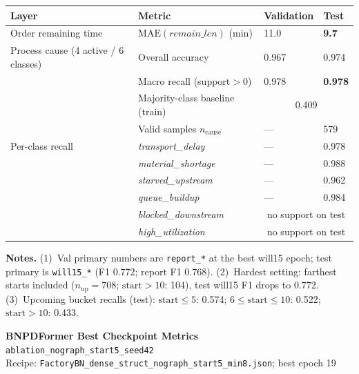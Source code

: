 \documentclass[10pt,a4paper]{article}
\begin{document}
\begin{center}
\begin{tabular}{l l l l}
\toprule
Layer & Metric & Validation & Test \\
\midrule
Order remaining time
  & $\mathrm{MAE}(\textit{remain\_len})$ (min)
  & 11.0
  & \textbf{9.7} \\
\midrule
Process cause (4 active / 6 classes)
  & Overall accuracy
  & 0.967
  & 0.974 \\
  & Macro recall (support${>}0$)
  & 0.978
  & \textbf{0.978} \\
  & Majority-class baseline (train)
  & \multicolumn{2}{c}{0.409} \\
  & Valid samples $n_{\mathrm{cause}}$
  & ---
  & 579 \\
\midrule
Per-class recall
  & \textit{transport\_delay}
  & --- & 0.978 \\
  & \textit{material\_shortage}
  & --- & 0.988 \\
  & \textit{starved\_upstream}
  & --- & 0.962 \\
  & \textit{queue\_buildup}
  & --- & 0.984 \\
  & \textit{blocked\_downstream}
  & \multicolumn{2}{c}{no support on test} \\
  & \textit{high\_utilization}
  & \multicolumn{2}{c}{no support on test} \\
\bottomrule
\end{tabular}
\end{center}

\small
\textbf{Notes.}
(1)~Val primary numbers are \texttt{report\_*} at the best will15 epoch; test primary is \texttt{will15\_*} (F1 0.772; report F1 0.768).
(2)~Hardest setting: farthest starts included ($n_{\mathrm{up}}{=}708$; $\mathrm{start}{>}10$: 104), test will15 F1 drops to 0.772.
(3)~Upcoming bucket recalls (test): $\mathrm{start}\le5$: 0.574; $6\le\mathrm{start}\le10$: 0.522; $\mathrm{start}{>}10$: 0.433.


\clearpage
\begin{center}
{\LARGE\bfseries BNPDFormer Best Checkpoint Metrics}\\[3pt]
{\large\texttt{ablation\_nograph\_start5\_seed42}}\\[2pt]
{\normalsize Recipe: \texttt{FactoryBN\_dense\_struct\_nograph\_start5\_min8.json}; best epoch 19}
\end{center}
\end{document}
